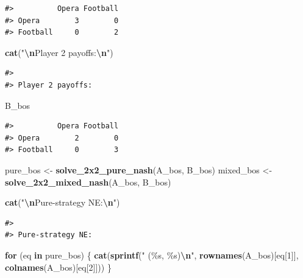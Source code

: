 \documentclass[
]{article}
\newenvironment{Shaded}{\begin{snugshade}}{\end{snugshade}}
\newcommand{\ControlFlowTok}[1]{\textcolor[rgb]{0.13,0.29,0.53}{\textbf{#1}}}
\newcommand{\DecValTok}[1]{\textcolor[rgb]{0.00,0.00,0.81}{#1}}
\newcommand{\FunctionTok}[1]{\textcolor[rgb]{0.13,0.29,0.53}{\textbf{#1}}}
\newcommand{\NormalTok}[1]{#1}
\newcommand{\OtherTok}[1]{\textcolor[rgb]{0.56,0.35,0.01}{#1}}
\newcommand{\SpecialCharTok}[1]{\textcolor[rgb]{0.81,0.36,0.00}{\textbf{#1}}}
\newcommand{\StringTok}[1]{\textcolor[rgb]{0.31,0.60,0.02}{#1}}
\begin{document}
\begin{verbatim}
#>          Opera Football
#> Opera        3        0
#> Football     0        2
\end{verbatim}

\begin{Shaded}
\begin{Highlighting}[]
\FunctionTok{cat}\NormalTok{(}\StringTok{"}\SpecialCharTok{\textbackslash{}n}\StringTok{Player 2 payoffs:}\SpecialCharTok{\textbackslash{}n}\StringTok{"}\NormalTok{)}
\end{Highlighting}
\end{Shaded}

\begin{verbatim}
#> 
#> Player 2 payoffs:
\end{verbatim}

\begin{Shaded}
\begin{Highlighting}[]
\NormalTok{B\_bos}
\end{Highlighting}
\end{Shaded}

\begin{verbatim}
#>          Opera Football
#> Opera        2        0
#> Football     0        3
\end{verbatim}

\begin{Shaded}
\begin{Highlighting}[]
\NormalTok{pure\_bos }\OtherTok{\textless{}{-}} \FunctionTok{solve\_2x2\_pure\_nash}\NormalTok{(A\_bos, B\_bos)}
\NormalTok{mixed\_bos }\OtherTok{\textless{}{-}} \FunctionTok{solve\_2x2\_mixed\_nash}\NormalTok{(A\_bos, B\_bos)}

\FunctionTok{cat}\NormalTok{(}\StringTok{"}\SpecialCharTok{\textbackslash{}n}\StringTok{Pure{-}strategy NE:}\SpecialCharTok{\textbackslash{}n}\StringTok{"}\NormalTok{)}
\end{Highlighting}
\end{Shaded}

\begin{verbatim}
#> 
#> Pure-strategy NE:
\end{verbatim}

\begin{Shaded}
\begin{Highlighting}[]
\ControlFlowTok{for}\NormalTok{ (eq }\ControlFlowTok{in}\NormalTok{ pure\_bos) \{}
  \FunctionTok{cat}\NormalTok{(}\FunctionTok{sprintf}\NormalTok{(}\StringTok{"  (\%s, \%s)}\SpecialCharTok{\textbackslash{}n}\StringTok{"}\NormalTok{, }\FunctionTok{rownames}\NormalTok{(A\_bos)[eq[}\DecValTok{1}\NormalTok{]], }\FunctionTok{colnames}\NormalTok{(A\_bos)[eq[}\DecValTok{2}\NormalTok{]]))}
\NormalTok{\}}
\end{Highlighting}
\end{Shaded}
\end{document}
